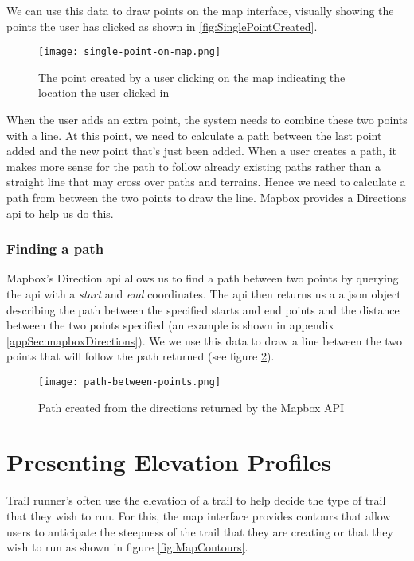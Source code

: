 We can use this data to draw points on the map interface, visually showing the points the user has clicked as shown in \autoref{fig:SinglePointCreated}.

\begin{figure}[ht]
    \centering
    \texttt{[image: single-point-on-map.png]}
    \caption{The point created by a user clicking on the map indicating the location the user clicked in}
    \label{fig:SinglePointCreated}
\end{figure}
When the user adds an extra point, the system needs to combine these two points with a line. At this point, we need to calculate a path between the last point added and the new point that's just been added. When a user creates a path, it makes more sense for the path to follow already existing paths rather than a straight line that may cross over paths and terrains. Hence we need to calculate a path from between the two points to draw the line. Mapbox provides a Directions \acrshort{api} to help us do this.


\subsubsection{Finding a path}
Mapbox's Direction \acrshort{api} allows us to find a path between two points by querying the \acrshort{api} with a \textit{start} and \textit{end} coordinates.  The \acrshort{api} then returns us a a \acrshort{json} object describing the path between the specified starts and end points and the distance between the two points specified (an example is shown in appendix \ref{appSec:mapboxDirections}). We we use this data to draw a line between the two points that will follow the path returned (see figure \ref{fig:PathCreated}).

\begin{figure}[htb!]
    \centering
    \texttt{[image: path-between-points.png]}
    \caption{Path created from the directions returned by the Mapbox API}
    \label{fig:PathCreated}
\end{figure}

\section{Presenting Elevation Profiles} \label{elevationProfile}
Trail runner's often use the elevation of a trail to help decide the type of trail that they wish to run. For this, the map interface provides contours that allow users to anticipate the steepness of the trail that they are creating or that they wish to run as shown in figure \ref{fig:MapContours}.

